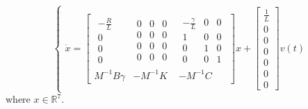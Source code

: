 \begin{equation}
\begin{cases}
\dot{x}=
\left[ \begin{array} { c|c|c  } 
                \begin{array}{c} 
               -\frac{R}{L} \\ 
                0 \\
                0 \\
                0
                \end{array} &
                \begin{array}{ccc} 
               0 & 0 & 0\\ 
                0 & 0  &0 \\
                0  & 0  & 0\\
                0 & 0 &0
                \end{array}&
                \begin{array}{ccc} 
               -\frac{\gamma}{L} & 0 &0\\ 
                1 & 0 &0 \\
                0  & 1  &0 \\
                0 & 0 & 1
                \end{array} \\
                \hline 
                M^{-1}B\gamma& -M^{-1}K & -M^{-1}C
\end{array} \right] 
x+\begin{bmatrix}\frac{1}{L} \\ 0 \\ 0 \\ 0 \\ 0\\0 \\0 \end{bmatrix}v(t)
\end{cases}
\end{equation}
where $x \in \mathbb{R}^7$.
